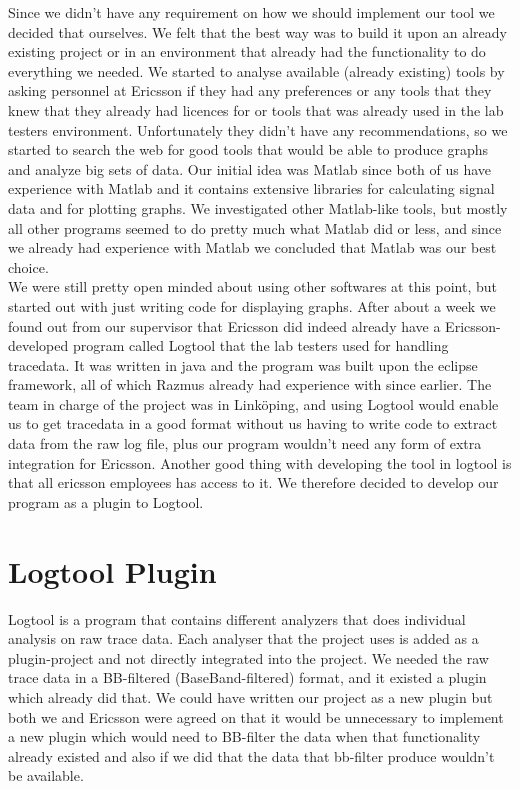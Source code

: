 \documentclass[cropmarks, frame, english]{idamasterthesis}
\begin{document}
Since we didn't have any requirement on how we should implement our tool we decided that ourselves. We felt that the best way was to build it upon an already existing project or in an environment that already had the functionality to do everything we needed. \newline
We started to analyse available (already existing) tools by asking personnel at Ericsson if they had any preferences or any tools that they knew that they already had licences for or tools that was already used in the lab testers environment. Unfortunately they didn't have any recommendations, so we started to search the web for good tools that would be able to produce graphs and analyze big sets of data. Our initial idea was Matlab since both of us have experience with Matlab and it contains extensive libraries for calculating signal data and for plotting graphs. We investigated other Matlab-like tools, but mostly all other programs seemed to do pretty much what Matlab did or less, and since we already had experience with Matlab we concluded that Matlab was our best choice. \\
We were still pretty open minded about using other softwares at this point, but started out with just writing code for displaying graphs. After about a week we found out from our supervisor that Ericsson did indeed already have a Ericsson-developed program called Logtool that the lab testers used for handling tracedata. It was written in java and the program was built upon the eclipse framework, all of which Razmus already had experience with since earlier. The team in charge of the project was in Link\"{o}ping, and using Logtool would enable us to get tracedata in a good format without us having to write code to extract data from the raw log file, plus our program wouldn't need any form of extra integration for Ericsson. Another good thing with developing the tool in logtool is that all ericsson employees has access to it.
We therefore decided to develop our program as a plugin to Logtool.

\section{Logtool Plugin}
Logtool is a program that contains different analyzers that does individual analysis on raw trace data. Each analyser that the project uses is added as a plugin-project and not directly integrated into the project. We needed the raw trace data in a BB-filtered (BaseBand-filtered) format, and it existed a plugin which already did that. We could have written our project as a new plugin but both we and Ericsson were agreed on that it would be unnecessary to implement a new plugin which would need to BB-filter the data when that functionality already existed and also if we did that the data that bb-filter produce wouldn't be available.
\end{document}
